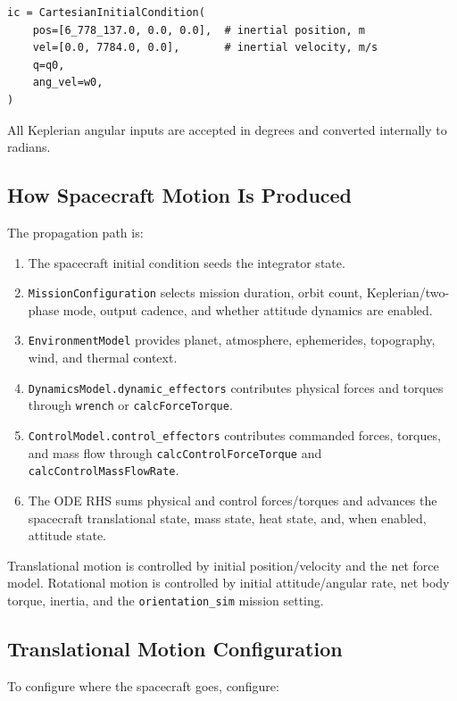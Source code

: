 \documentclass[11pt]{article}
\begin{document}
\begin{lstlisting}
ic = CartesianInitialCondition(
    pos=[6_778_137.0, 0.0, 0.0],  # inertial position, m
    vel=[0.0, 7784.0, 0.0],       # inertial velocity, m/s
    q=q0,
    ang_vel=w0,
)
\end{lstlisting}

All Keplerian angular inputs are accepted in degrees and converted internally
to radians.

\subsection{How Spacecraft Motion Is Produced}

The propagation path is:

\begin{enumerate}
  \item The spacecraft initial condition seeds the integrator state.
  \item \texttt{MissionConfiguration} selects mission duration, orbit count,
        Keplerian/two-phase mode, output cadence, and whether attitude dynamics
        are enabled.
  \item \texttt{EnvironmentModel} provides planet, atmosphere, ephemerides,
        topography, wind, and thermal context.
  \item \texttt{DynamicsModel.dynamic\_effectors} contributes physical forces
        and torques through \texttt{wrench} or \texttt{calcForceTorque}.
  \item \texttt{ControlModel.control\_effectors} contributes commanded forces,
        torques, and mass flow through \texttt{calcControlForceTorque} and
        \texttt{calcControlMassFlowRate}.
  \item The ODE RHS sums physical and control forces/torques and advances the
        spacecraft translational state, mass state, heat state, and, when
        enabled, attitude state.
\end{enumerate}

Translational motion is controlled by initial position/velocity and the net
force model. Rotational motion is controlled by initial attitude/angular rate,
net body torque, inertia, and the \texttt{orientation\_sim} mission setting.

\subsection{Translational Motion Configuration}

To configure where the spacecraft goes, configure:
\end{document}
